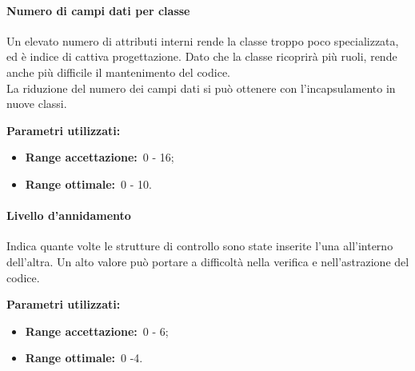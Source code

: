 			\paragraph{Numero di campi dati per classe}
				\label{sec:3.7.3.3}
				Un elevato numero di attributi interni rende la classe troppo poco specializzata, ed è indice di cattiva progettazione. Dato che la classe ricoprirà più ruoli, rende anche più difficile il mantenimento del codice. \\
				La riduzione del numero dei campi dati si può ottenere con l'incapsulamento in nuove classi.
				
				\textbf{Parametri utilizzati:}
				\begin{itemize}
					\item \textbf{Range accettazione:}\ 0 - 16;
					\item \textbf{Range ottimale:}\ 0 - 10.
				\end{itemize}
			\paragraph{Livello d'annidamento}
				\label{sec:3.7.3.4}
				Indica quante volte le strutture di controllo sono state inserite l'una all'interno dell'altra. Un alto valore può portare a difficoltà nella verifica e nell'astrazione del codice.
				
				\textbf{Parametri utilizzati:}
				\begin{itemize}
					\item \textbf{Range accettazione:}\ 0 - 6;
					\item \textbf{Range ottimale:}\ 0 -4.
				\end{itemize}
